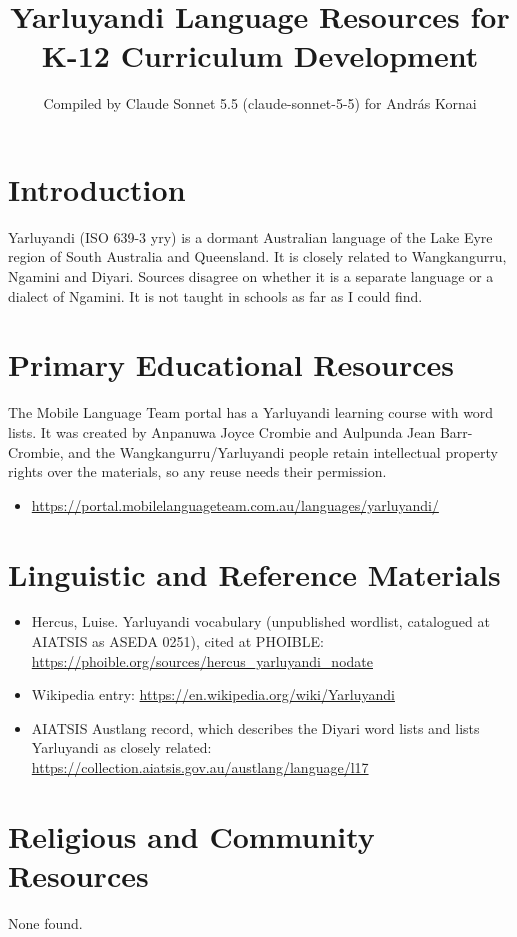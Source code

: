 \documentclass[12pt]{article}
\title{Yarluyandi Language Resources for K-12 Curriculum Development}
\author{Compiled by Claude Sonnet 5.5 (claude-sonnet-5-5) for Andr\'as Kornai}
\date{}
\begin{document}
\maketitle

\section{Introduction}
Yarluyandi (ISO 639-3 yry) is a dormant Australian language of the Lake Eyre region of South Australia and Queensland. It is closely related to Wangkangurru, Ngamini and Diyari. Sources disagree on whether it is a separate language or a dialect of Ngamini. It is not taught in schools as far as I could find.

\section{Primary Educational Resources}
The Mobile Language Team portal has a Yarluyandi learning course with word lists. It was created by Anpanuwa Joyce Crombie and Aulpunda Jean Barr-Crombie, and the Wangkangurru/Yarluyandi people retain intellectual property rights over the materials, so any reuse needs their permission.
\begin{itemize}
\item \url{https://portal.mobilelanguageteam.com.au/languages/yarluyandi/}
\end{itemize}

\section{Linguistic and Reference Materials}
\begin{itemize}
\item Hercus, Luise. Yarluyandi vocabulary (unpublished wordlist, catalogued at AIATSIS as ASEDA 0251), cited at PHOIBLE: \url{https://phoible.org/sources/hercus_yarluyandi_nodate}
\item Wikipedia entry: \url{https://en.wikipedia.org/wiki/Yarluyandi}
\item AIATSIS Austlang record, which describes the Diyari word lists and lists Yarluyandi as closely related: \url{https://collection.aiatsis.gov.au/austlang/language/l17}
\end{itemize}

\section{Religious and Community Resources}
None found.
\end{document}
